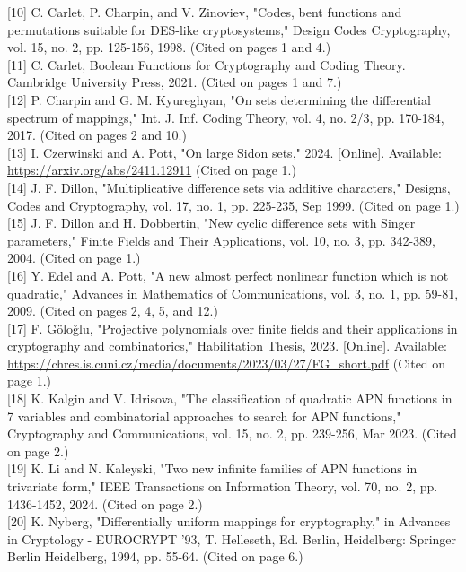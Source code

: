 \documentclass[10pt]{article}
\begin{document}
[10] C. Carlet, P. Charpin, and V. Zinoviev, "Codes, bent functions and permutations suitable for DES-like cryptosystems," Design Codes Cryptography, vol. 15, no. 2, pp. 125-156, 1998. (Cited on pages 1 and 4.)\\[0pt]
[11] C. Carlet, Boolean Functions for Cryptography and Coding Theory. Cambridge University Press, 2021. (Cited on pages 1 and 7.)\\[0pt]
[12] P. Charpin and G. M. Kyureghyan, "On sets determining the differential spectrum of mappings," Int. J. Inf. Coding Theory, vol. 4, no. 2/3, pp. 170-184, 2017. (Cited on pages 2 and 10.)\\[0pt]
[13] I. Czerwinski and A. Pott, "On large Sidon sets," 2024. [Online]. Available: \href{https://arxiv.org/abs/2411.12911}{https://arxiv.org/abs/2411.12911} (Cited on page 1.)\\[0pt]
[14] J. F. Dillon, "Multiplicative difference sets via additive characters," Designs, Codes and Cryptography, vol. 17, no. 1, pp. 225-235, Sep 1999. (Cited on page 1.)\\[0pt]
[15] J. F. Dillon and H. Dobbertin, "New cyclic difference sets with Singer parameters," Finite Fields and Their Applications, vol. 10, no. 3, pp. 342-389, 2004. (Cited on page 1.)\\[0pt]
[16] Y. Edel and A. Pott, "A new almost perfect nonlinear function which is not quadratic," Advances in Mathematics of Communications, vol. 3, no. 1, pp. 59-81, 2009. (Cited on pages 2, 4, 5, and 12.)\\[0pt]
[17] F. Göloğlu, "Projective polynomials over finite fields and their applications in cryptography and combinatorics," Habilitation Thesis, 2023. [Online]. Available: \href{https://chres.is.cuni.cz/media/documents/2023/03/27/FG_short.pdf}{https://chres.is.cuni.cz/media/documents/2023/03/27/FG\_short.pdf} (Cited on page 1.)\\[0pt]
[18] K. Kalgin and V. Idrisova, "The classification of quadratic APN functions in 7 variables and combinatorial approaches to search for APN functions," Cryptography and Communications, vol. 15, no. 2, pp. 239-256, Mar 2023. (Cited on page 2.)\\[0pt]
[19] K. Li and N. Kaleyski, "Two new infinite families of APN functions in trivariate form," IEEE Transactions on Information Theory, vol. 70, no. 2, pp. 1436-1452, 2024. (Cited on page 2.)\\[0pt]
[20] K. Nyberg, "Differentially uniform mappings for cryptography," in Advances in Cryptology - EUROCRYPT '93, T. Helleseth, Ed. Berlin, Heidelberg: Springer Berlin Heidelberg, 1994, pp. 55-64. (Cited on page 6.)\\[0pt]
\end{document}
